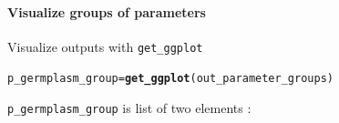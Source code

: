 \documentclass{book}\usepackage[]{graphicx}\usepackage[]{color}
\makeatletter
\newcommand{\hlstd}[1]{\textcolor[rgb]{0.345,0.345,0.345}{#1}}%
\newcommand{\hlkwb}[1]{\textcolor[rgb]{0.69,0.353,0.396}{#1}}%
\newcommand{\hlkwd}[1]{\textcolor[rgb]{0.737,0.353,0.396}{\textbf{#1}}}%
\newenvironment{kframe}{%
 \def\at@end@of@kframe{}%
 \ifinner\ifhmode%
  \def\at@end@of@kframe{\end{minipage}}%
  \begin{minipage}{\columnwidth}%
 \fi\fi%
 \def\FrameCommand##1{\hskip\@totalleftmargin \hskip-\fboxsep
 \colorbox{shadecolor}{##1}\hskip-\fboxsep
     \hskip-\linewidth \hskip-\@totalleftmargin \hskip\columnwidth}%
 \MakeFramed {\advance\hsize-\width
   \@totalleftmargin\z@ \linewidth\hsize
   \@setminipage}}%
 {\par\unskip\endMakeFramed%
 \at@end@of@kframe}
\newenvironment{knitrout}{}{} %
\makeatother
\begin{document}
\paragraph{Visualize groups of parameters}

Visualize outputs with \texttt{get\_ggplot}

\begin{knitrout}
\color{fgcolor}\begin{kframe}
\begin{alltt}
\hlstd{p_germplasm_group} \hlkwb{=} \hlkwd{get_ggplot}\hlstd{(out_parameter_groups)}
\end{alltt}
\end{kframe}
\end{knitrout}

\texttt{p\_germplasm\_group} is list of two elements :
\end{document}
